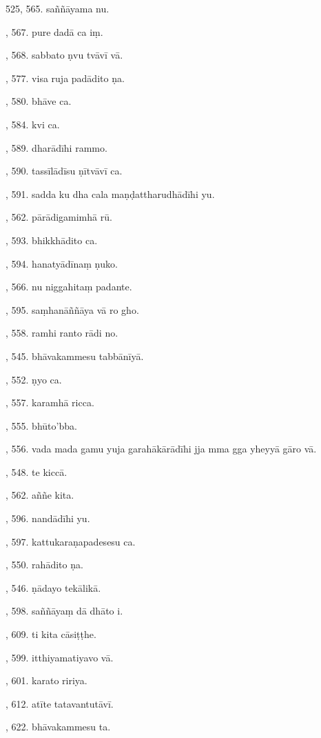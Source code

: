 525, 565. saññāyama nu.\par {}, 567. pure dadā ca iṃ.\par {}, 568. sabbato ṇvu tvāvī vā.\par {}, 577. visa ruja padādito ṇa.\par {}, 580. bhāve ca.\par {}, 584. kvi ca.\par {}, 589. dharādīhi rammo.\par {}, 590. tassīlādīsu ṇītvāvī ca.\par {}, 591. sadda ku dha cala maṇḍattharudhādīhi yu.\par {}, 562. pārādigamimhā rū.\par {}, 593. bhikkhādito ca.\par {}, 594. hanatyādīnaṃ ṇuko.\par {}, 566. nu niggahitaṃ padante.\par {}, 595. saṃhanāññāya vā ro gho.\par {}, 558. ramhi ranto rādi no.\par {}, 545. bhāvakammesu tabbānīyā.\par {}, 552. ṇyo ca.\par {}, 557. karamhā ricca.\par {}, 555. bhūto’bba.\par {}, 556. vada mada gamu yuja garahākārādīhi jja mma gga yheyyā gāro vā.\par {}, 548. te kiccā.\par {}, 562. aññe kita.\par {}, 596. nandādīhi yu.\par {}, 597. kattukaraṇapadesesu ca.\par {}, 550. rahādito ṇa.\par {}, 546. ṇādayo tekālikā.\par {}, 598. saññāyaṃ dā dhāto i.\par {}, 609. ti kita cāsiṭṭhe.\par {}, 599. itthiyamatiyavo vā.\par {}, 601. karato ririya.\par {}, 612. atīte tatavantutāvī.\par {}, 622. bhāvakammesu ta.\par \noindent
